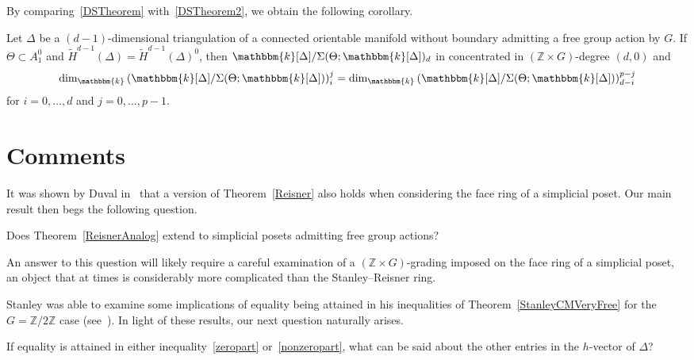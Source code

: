 \documentclass[ALCO,ThmDefs,Unicode]{cedram}
\newcommand{\field}{\mathbbm{k}}
\newcommand{\ZZ}{{\mathbb Z}}
\begin{document}
By comparing~\ref{DSTheorem} with~\ref{DSTheorem2}, we obtain the following corollary.

\begin{coro}
Let $\Delta$ be a $(d-1)$-dimensional triangulation of a connected orientable manifold without boundary admitting a free group action by $G$. If $\Theta\subset A_1^0$ and $\widetilde{H}^{d-1}(\Delta)=\widetilde{H}^{d-1}(\Delta)^0$, then $\field[\Delta]/\Sigma(\Theta;\field[\Delta])_d$ in concentrated in $(\ZZ\times G)$-degree $(d, 0)$ and
\[
\dim_\field \left(\field[\Delta]/\Sigma(\Theta;\field[\Delta])\right)_i^j = \dim_\field \left(\field[\Delta]/\Sigma(\Theta;\field[\Delta])\right)_{d-i}^{p-j}
\]
for $i=0, \ldots, d$ and $j=0, \ldots, p-1$.
\end{coro}


\section{Comments}\label{comments}

It was shown by Duval in~\cite{Duval} that a version of Theorem~\ref{Reisner} also holds when considering the face ring of a simplicial poset. Our main result then begs the following question.

\begin{question}
Does Theorem~\ref{ReisnerAnalog} extend to simplicial posets admitting free group actions?
\end{question}

An answer to this question will likely require a careful examination of a $(\ZZ\times G)$-grading imposed on the face ring of a simplicial poset, an object that at times is considerably more complicated than the Stanley--Reisner ring.

Stanley was able to examine some implications of equality being attained in his inequalities of Theorem~\ref{StanleyCMVeryFree} for the $G=\ZZ/2\ZZ$ case (see~\cite[Proposition~III.8.2]{St-96}). In light of these results, our next question naturally arises.

\begin{question}
If equality is attained in either inequality~\eqref{zeropart} or~\eqref{nonzeropart}, what can be said about the other entries in the $h$-vector of $\Delta$?
\end{question}
\end{document}
